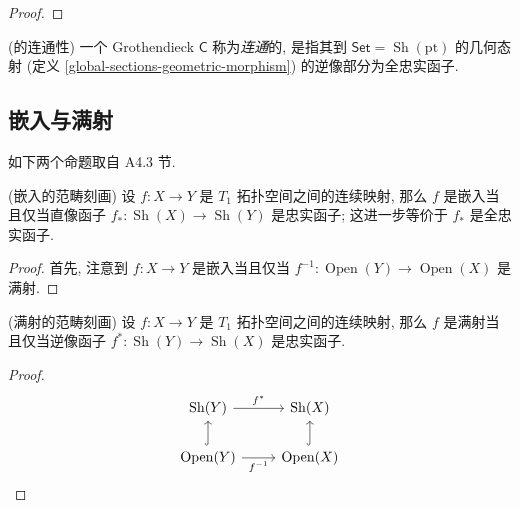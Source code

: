 \begin{proof}
	\todo{}
\end{proof}

\begin{definition}
	{(\topos{}的连通性)}
	一个 Grothendieck \topos{} $\mathsf C$ 称为\emph{连通}的, 是指其到 $\mathsf {Set}=\operatorname{Sh}(\text{pt})$ 的几何态射 (定义 \ref{global-sections-geometric-morphism}) 的逆像部分为全忠实函子.
\end{definition}

\subsection{嵌入与满射}

如下两个命题取自 \cite{Elephant} A4.3 节.

\begin{prop}
	{(嵌入的范畴刻画)}
	设 $f\colon X\to Y$ 是 $T_1$ 拓扑空间\footnotemark 之间的连续映射, 那么 $f$ 是嵌入当且仅当直像函子 $f_* \colon \operatorname{Sh}(X)\to\operatorname{Sh}(Y)$ 是忠实函子; 这进一步等价于 $f_*$ 是全忠实函子.
\end{prop}



\begin{proof}
	首先, 注意到 $f\colon X \to Y$ 是嵌入当且仅当 $f^{-1}\colon \operatorname{Open}(Y)\to \operatorname{Open}(X)$ 是满射.
\end{proof}


\begin{prop}
	{(满射的范畴刻画)}
	设 $f\colon X\to Y$ 是 $T_1$ 拓扑空间之间的连续映射, 那么 $f$ 是满射当且仅当逆像函子 $f^* \colon \operatorname{Sh}(Y)\to\operatorname{Sh}(X)$ 是忠实函子.
\end{prop}

\begin{proof}
	\[\begin{tikzcd}[ampersand replacement=\&]
		{\operatorname{Sh}(Y)} \& {\operatorname{Sh}(X)} \\
		{\operatorname{Open}(Y)} \& {\operatorname{Open}(X)}
		\arrow["{f^*}", from=1-1, to=1-2]
		\arrow["{f^{-1}}"', from=2-1, to=2-2]
		\arrow[hook, from=2-1, to=1-1]
		\arrow[hook, from=2-2, to=1-2]
	\end{tikzcd}\]
\end{proof}


